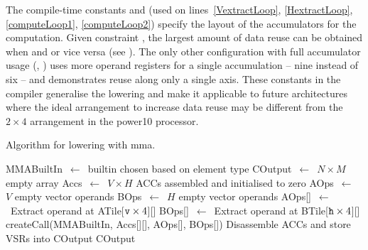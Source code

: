 \documentclass[\main/thesis.tex]{subfiles}
\begin{document}
The compile-time constants  and  (used on lines~\ref{VextractLoop}, \ref{HextractLoop}, \ref{computeLoop1}, \ref{computeLoop2}) specify the layout of the accumulators for the computation.
Given constraint , the largest amount of data reuse can be obtained when  and  or vice versa (see ).
The only other configuration with full accumulator usage (, ) uses more operand registers for a single accumulation -- nine instead of six -- and demonstrates reuse along only a single axis.
These constants in the compiler generalise the lowering and make it applicable to future architectures where the ideal arrangement to increase data reuse may be different from the $2 \times 4$ arrangement in the \gls{power10} processor.

\begin{algorithm}[t]
  \caption[Algorithm for lowering ]{Algorithm for lowering  with \gls{mma}.}
  \label{alg:intrinsic}
  \begin{algorithmic}[1]
    \State MMABuiltIn~$\gets$~builtin chosen based on element type\label{chooseBuiltin}
    \State COutput~$\gets$~$N \times M$ empty array\label{createC}
    \State Accs~$\gets$~$V \times H$ ACCs assembled and initialised to zero\label{zeroAccs}
    \label{unrollLoopStart}
      \State AOps~$\gets$~$V$ empty vector operands
      \State BOps~$\gets$~$H$ empty vector operands
      \label{VextractLoop}
        \State AOps[]~$\gets$~Extract operand at ATile[$\text{\code{v}} \times 4$][]\label{aOps}
        \EndFor
      \label{HextractLoop}
         \State BOps[]~$\gets$~Extract operand at BTile[$\text{\code{h}} \times 4$][]\label{bOps}
      \EndFor
      \label{computeLoop1}
        \label{computeLoop2}
          \State createCall(MMABuiltIn, {Accs[][], AOps[], BOps[]})\label{builtinCallCreate}
        \EndFor
      \EndFor
    \EndFor\label{accLoopEnd}
    \State Disassemble ACCs and store VSRs into COutput\label{disStore}
    \State \Return COutput\label{return}
    \EndFunction
  \end{algorithmic}
\end{algorithm}
\end{document}
